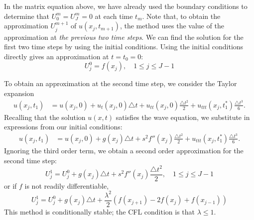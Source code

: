 In the matrix equation above, we have already used the boundary conditions to determine that $U_{0}^{m} = U_{J}^{m} = 0$ at each time $t_m$.
Note that, to obtain the approximation $U_{j}^{m+1}$ of $u(x_j,t_{m+1})$, the method uses the value of the approximation at \emph{the previous two time steps}.
We can find the solution for the first two time steps by using the initial conditions.
Using the initial conditions directly gives an approximation at $t = t_0 = 0:$
\[U_{j}^{0} = f(x_j), \quad 1 \leq j \leq J-1\]

To obtain an approximation at the second time step, we consider the Taylor expansion
\begin{align*}
	u(x_j,t_1) &= u(x_j, 0) + u_t(x_j,0) \triangle t + u_{tt}(x_j,0) \frac{\triangle t^2}{2} + u_{ttt}(x_j,t_1^*) \frac{\triangle t^3}{6}.
\end{align*}
Recalling that the solution $u(x,t)$ satisfies the wave equation, we substitute in expressions from our initial conditions:
\begin{align*}
	u(x_j,t_1) &= u(x_j, 0) +  g(x_j) \triangle t+ s^2 f''(x_j)\frac{\triangle t^2}{2} +  u_{ttt}(x_j,t_1^*) \frac{\triangle t^3}{6}.
\end{align*}
Ignoring the third order term, we obtain a second order approximation for the second time step:
\[U_{j}^{1}= U_{j}^{0} + g(x_j) \triangle t+ s^2 f''(x_j) \frac{\triangle t^2}{2}, \quad 1 \leq j \leq J-1\]
or if $f$ is not readily differentiable,
\[U_{j}^{1}= U_{j}^{0} + g(x_j) \triangle t+ \frac{\lambda^2}{2} (f(x_{j+1}) -2 f(x_{j}) + f(x_{j-1}))\]
This method is conditionally stable; the CFL condition is that $\lambda \leq 1$.

